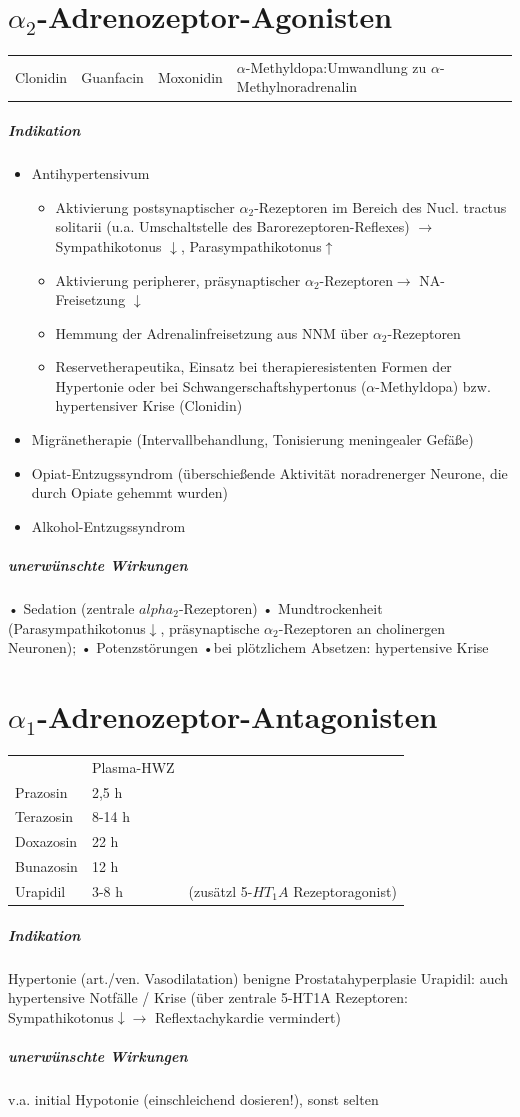 \documentclass[10pt,a4paper]{report}
\begin{document}
\section{$\alpha_2$-Adrenozeptor-Agonisten}
\begin{tabularx}{\textwidth}{XXXX}
Clonidin&Guanfacin&Moxonidin&$\alpha$-Methyldopa:Umwandlung zu $\alpha$-Methylnoradrenalin
\end{tabularx}
\subparagraph{Indikation}
\begin{itemize}
	\item Antihypertensivum
	\begin{itemize}
		\item Aktivierung postsynaptischer $\alpha_2$-Rezeptoren im Bereich des	Nucl. tractus solitarii (u.a. Umschaltstelle des Barorezeptoren-Reflexes) $\rightarrow$ Sympathikotonus $\downarrow$, Parasympathikotonus$\uparrow$
		\item Aktivierung peripherer, präsynaptischer $\alpha_2$-Rezeptoren$\rightarrow$ NA-Freisetzung $\downarrow$ 
		\item Hemmung der Adrenalinfreisetzung aus NNM über $\alpha_2$-Rezeptoren 
		\item Reservetherapeutika, Einsatz bei therapieresistenten Formen 	der Hypertonie oder bei Schwangerschaftshypertonus	($\alpha$-Methyldopa) bzw. hypertensiver Krise (Clonidin)
	\end{itemize}	
	\item Migränetherapie (Intervallbehandlung, Tonisierung meningealer Gefäße)
	\item Opiat-Entzugssyndrom (überschießende Aktivität noradrenerger Neurone, die durch Opiate gehemmt wurden)
	\item Alkohol-Entzugssyndrom 
\end{itemize}
\subparagraph{unerwünschte Wirkungen}
• Sedation (zentrale $alpha_2$-Rezeptoren) • Mundtrockenheit (Parasympathikotonus$\downarrow$, präsynaptische $\alpha_2$-Rezeptoren an cholinergen Neuronen); • Potenzstörungen •bei plötzlichem Absetzen: hypertensive Krise
\section{$\alpha_1$-Adrenozeptor-Antagonisten}
\begin{tabularx}{\textwidth}{XXX}
&Plasma-HWZ&\\	   
Prazosin&2,5 h&\\		   
Terazosin&8-14 h&\\		   
Doxazosin&22 h&\\ 
Bunazosin&12 h&\\  
Urapidil&3-8 h&	(zusätzl 5-$HT_1A$ Rezeptoragonist)\\	  
\end{tabularx}
\subparagraph{Indikation}
Hypertonie (art./ven. Vasodilatation)
benigne Prostatahyperplasie
Urapidil: auch hypertensive Notfälle / Krise (über zentrale 5-HT1A Rezeptoren: Sympathikotonus$\downarrow \rightarrow$ Reflextachykardie vermindert)
\subparagraph{unerwünschte Wirkungen} v.a. initial Hypotonie (einschleichend dosieren!), sonst selten
\end{document}
